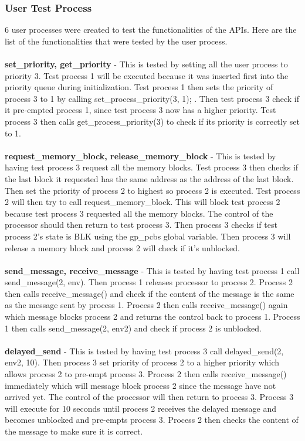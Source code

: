 \documentclass[12pt]{article}
\begin{document}
\subsubsection{User Test Process}
6 user processes were created to test the functionalities of the APIs. Here are the list of the functionalities that were tested by the user process.\\ \\ 
\textbf{set\_priority, get\_priority} - This is tested by setting all the user process to priority 3. Test process 1 will be executed because it was inserted first into the priority queue during initialization. Test process 1 then sets the priority of process 3 to 1 by calling set\_process\_priority(3, 1); . Then test process 3 check if it pre-empted process 1, since test process 3 now has a higher priority. Test process 3 then calls get\_process\_priority(3) to check if its priority is correctly set to 1. \\ \\
\textbf{request\_memory\_block,  release\_memory\_block} - This is tested by having test process 3 request all the memory blocks. Test process 3 then checks if the last block it requested has the same address as the address of the last block. Then set the priority of process 2 to highest so process 2 is executed. Test process 2 will then try to call request\_memory\_block. This will block test process 2 because test process 3 requested all the memory blocks. The control of the processor should then return to test process 3. Then process 3 checks if test process 2’s state is BLK using the gp\_pcbs global variable. Then process 3 will release a memory block and process 2 will check if it’s unblocked. \\ \\
\textbf{send\_message,  receive\_message }- This is tested by having test process 1 call send\_message(2, env). Then process 1 releases processor to process 2. Process 2 then calls receive\_message() and check if the content of the message is the same as the message sent by process 1. Process 2 then calls receive\_message() again which message blocks process 2 and returns the control back to process 1. Process 1 then calls send\_message(2, env2) and check if process 2 is unblocked.\\ \\
\textbf{delayed\_send} - This is tested by having test process 3 call delayed\_send(2, env2, 10). Then process 3 set priority of process 2 to a higher priority which allows process 2 to pre-empt process 3. Process 2 then calls receive\_message() immediately which will message block process 2 since the message have not arrived yet. The control of the processor will then return to process 3. Process 3 will execute for 10 seconds until process 2 receives the delayed message and becomes unblocked and pre-empts process 3. Process 2 then checks the content of the message to make sure it is correct.
\end{document}
